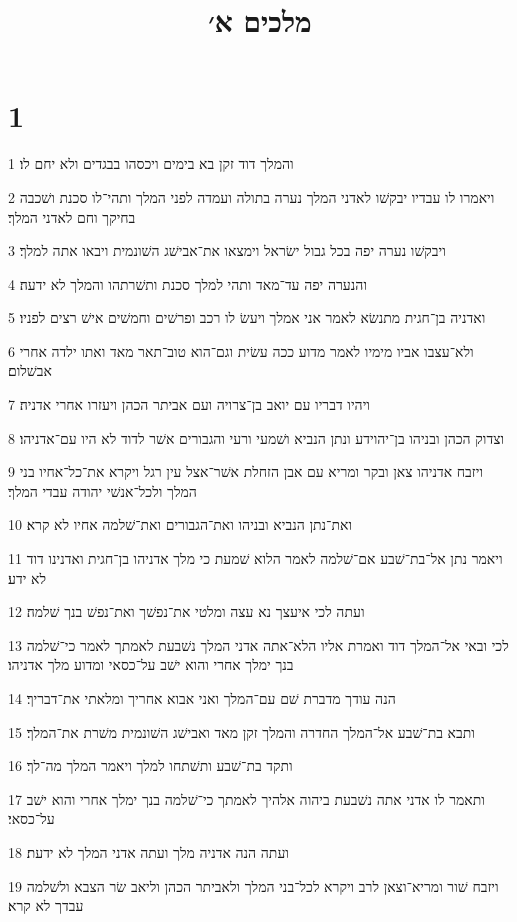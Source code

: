 

\title{מלכים א׳}


\chapter{1}

\par 1 והמלך דוד זקן בא בימים ויכסהו בבגדים ולא יחם לו׃
\par 2 ויאמרו לו עבדיו יבקשׁו לאדני המלך נערה בתולה ועמדה לפני המלך ותהי־לו סכנת ושׁכבה בחיקך וחם לאדני המלך׃
\par 3 ויבקשׁו נערה יפה בכל גבול ישׂראל וימצאו את־אבישׁג השׁונמית ויבאו אתה למלך׃
\par 4 והנערה יפה עד־מאד ותהי למלך סכנת ותשׁרתהו והמלך לא ידעה׃
\par 5 ואדניה בן־חגית מתנשׂא לאמר אני אמלך ויעשׂ לו רכב ופרשׁים וחמשׁים אישׁ רצים לפניו׃
\par 6 ולא־עצבו אביו מימיו לאמר מדוע ככה עשׂית וגם־הוא טוב־תאר מאד ואתו ילדה אחרי אבשׁלום׃
\par 7 ויהיו דבריו עם יואב בן־צרויה ועם אביתר הכהן ויעזרו אחרי אדניה׃
\par 8 וצדוק הכהן ובניהו בן־יהוידע ונתן הנביא ושׁמעי ורעי והגבורים אשׁר לדוד לא היו עם־אדניהו׃
\par 9 ויזבח אדניהו צאן ובקר ומריא עם אבן הזחלת אשׁר־אצל עין רגל ויקרא את־כל־אחיו בני המלך ולכל־אנשׁי יהודה עבדי המלך׃
\par 10 ואת־נתן הנביא ובניהו ואת־הגבורים ואת־שׁלמה אחיו לא קרא׃
\par 11 ויאמר נתן אל־בת־שׁבע אם־שׁלמה לאמר הלוא שׁמעת כי מלך אדניהו בן־חגית ואדנינו דוד לא ידע׃
\par 12 ועתה לכי איעצך נא עצה ומלטי את־נפשׁך ואת־נפשׁ בנך שׁלמה׃
\par 13 לכי ובאי אל־המלך דוד ואמרת אליו הלא־אתה אדני המלך נשׁבעת לאמתך לאמר כי־שׁלמה בנך ימלך אחרי והוא ישׁב על־כסאי ומדוע מלך אדניהו׃
\par 14 הנה עודך מדברת שׁם עם־המלך ואני אבוא אחריך ומלאתי את־דבריך׃
\par 15 ותבא בת־שׁבע אל־המלך החדרה והמלך זקן מאד ואבישׁג השׁונמית משׁרת את־המלך׃
\par 16 ותקד בת־שׁבע ותשׁתחו למלך ויאמר המלך מה־לך׃
\par 17 ותאמר לו אדני אתה נשׁבעת ביהוה אלהיך לאמתך כי־שׁלמה בנך ימלך אחרי והוא ישׁב על־כסאי׃
\par 18 ועתה הנה אדניה מלך ועתה אדני המלך לא ידעת׃
\par 19 ויזבח שׁור ומריא־וצאן לרב ויקרא לכל־בני המלך ולאביתר הכהן וליאב שׂר הצבא ולשׁלמה עבדך לא קרא׃
